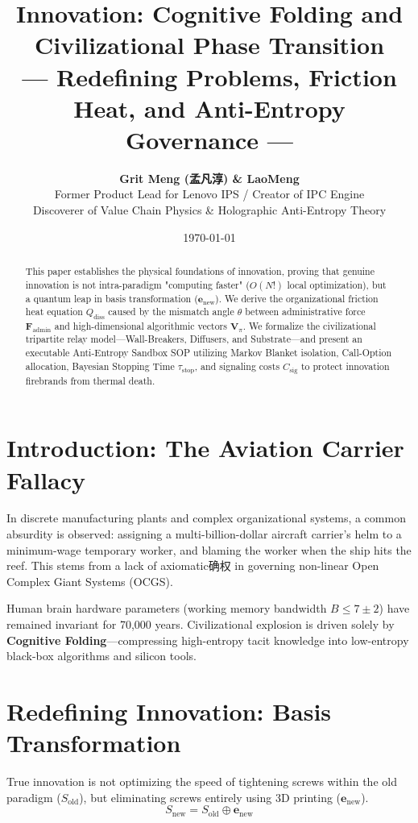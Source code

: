 \documentclass[11pt,a4paper]{article}
\title{\textbf{Innovation: Cognitive Folding and Civilizational Phase Transition}\\ \large — Redefining Problems, Friction Heat, and Anti-Entropy Governance —}
\author{\textbf{Grit Meng (孟凡淳) \& LaoMeng}\\ \small Former Product Lead for Lenovo IPS / Creator of IPC Engine \\ \small Discoverer of Value Chain Physics \& Holographic Anti-Entropy Theory}
\date{\today}
\begin{document}
\maketitle

\begin{abstract}
This paper establishes the physical foundations of innovation, proving that genuine innovation is not intra-paradigm "computing faster" ($O(N!)$ local optimization), but a quantum leap in basis transformation ($\mathbf{e}_{\text{new}}$). We derive the organizational friction heat equation $Q_{\text{diss}}$ caused by the mismatch angle $\theta$ between administrative force $\mathbf{F}_{\text{admin}}$ and high-dimensional algorithmic vectors $\mathbf{V}_\pi$. We formalize the civilizational tripartite relay model—Wall-Breakers, Diffusers, and Substrate—and present an executable Anti-Entropy Sandbox SOP utilizing Markov Blanket isolation, Call-Option allocation, Bayesian Stopping Time $\tau_{\text{stop}}$, and signaling costs $C_{\text{sig}}$ to protect innovation firebrands from thermal death.
\end{abstract}

\section{Introduction: The Aviation Carrier Fallacy}
In discrete manufacturing plants and complex organizational systems, a common absurdity is observed: assigning a multi-billion-dollar aircraft carrier's helm to a minimum-wage temporary worker, and blaming the worker when the ship hits the reef. This stems from a lack of axiomatic确权 in governing non-linear Open Complex Giant Systems (OCGS).

Human brain hardware parameters (working memory bandwidth $B \le 7 \pm 2$) have remained invariant for 70,000 years. Civilizational explosion is driven solely by \textbf{Cognitive Folding}—compressing high-entropy tacit knowledge into low-entropy black-box algorithms and silicon tools.

\section{Redefining Innovation: Basis Transformation}
True innovation is not optimizing the speed of tightening screws within the old paradigm ($S_{\text{old}}$), but eliminating screws entirely using 3D printing ($\mathbf{e}_{\text{new}}$).
\begin{equation}
S_{\text{new}} = S_{\text{old}} \oplus \mathbf{e}_{\text{new}}
\end{equation}
\end{document}
